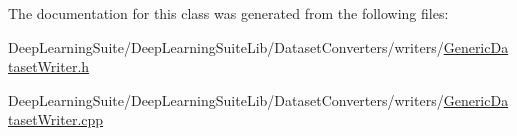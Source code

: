 The documentation for this class was generated from the following files\+:\begin{DoxyCompactItemize}
\item 
Deep\+Learning\+Suite/\+Deep\+Learning\+Suite\+Lib/\+Dataset\+Converters/writers/\hyperlink{_generic_dataset_writer_8h}{Generic\+Dataset\+Writer.\+h}\item 
Deep\+Learning\+Suite/\+Deep\+Learning\+Suite\+Lib/\+Dataset\+Converters/writers/\hyperlink{_generic_dataset_writer_8cpp}{Generic\+Dataset\+Writer.\+cpp}\end{DoxyCompactItemize}
